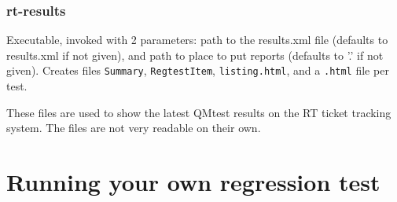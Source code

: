\documentclass[11pt]{article}
\begin{document}
\subsubsection{rt-results}
Executable, invoked with 2 parameters: path to the results.xml file (defaults
to results.xml if not given), 
and path to place to put reports (defaults to '.' if not given).
Creates files 
{\tt Summary}, 
{\tt RegtestItem}, 
{\tt listing.html},
and a {\tt .html} file per test.

These files are used to show the latest QMtest results on the 
RT ticket tracking system. 
 The files are not very readable on their own.


\section{Running your own regression test}
\end{document}
